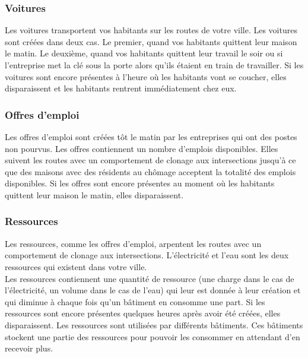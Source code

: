\documentclass[11pt]{report}
\begin{document}
\subsubsection{Voitures}
Les voitures transportent vos habitants sur les routes de votre ville. Les voitures sont créées dans deux cas. Le premier, quand vos habitants quittent leur maison le matin. Le deuxième, quand vos habitants quittent leur travail le soir ou si l'entreprise met la clé sous la porte alors qu'ils étaient en train de travailler. Si les voitures sont encore présentes à l'heure où les habitants vont se coucher, elles disparaissent et les habitants rentrent immédiatement chez eux.

\subsubsection{Offres d'emploi}
Les offres d'emploi sont créées tôt le matin par les entreprises qui ont des postes non pourvus. Les offres contiennent un nombre d'emplois disponibles. Elles suivent les routes avec un comportement de clonage aux intersections jusqu'à ce que des maisons avec des résidents au chômage acceptent la totalité des emplois disponibles. Si les offres sont encore présentes au moment où les habitants quittent leur maison le matin, elles disparaissent.

\subsubsection{Ressources}
Les ressources, comme les offres d'emploi, arpentent les routes avec un comportement de clonage aux intersections. L'électricité et l'eau sont les deux ressources qui existent dans votre ville.\\
Les ressources contiennent une quantité de ressource (une charge dans le cas de l'électricité, un volume dans le cas de l'eau) qui leur est donnée à leur création et qui diminue à chaque fois qu'un bâtiment en consomme une part. Si les ressources sont encore présentes quelques heures après avoir été créées, elles disparaissent. Les ressources sont utilisées par différents bâtiments. Ces bâtiments stockent une partie des ressources pour pouvoir les consommer en attendant d'en recevoir plus.



\newpage
\end{document}
